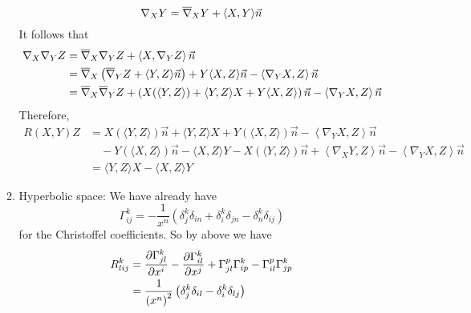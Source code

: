 \begin{enumerate}[label=\arabic{*}.]
\begin{exam}
\begin{enumerate}[label=(\arabic{*})]
			\begin{equation*}
				\nabla_X Y=\overline{\nabla}_X Y+\langle X, Y\rangle \vec{n}
			\end{equation*}
			It follows that
			\begin{equation*}
				\begin{aligned}
					\nabla_X\nabla_YZ &= \overline{\nabla}_X\nabla_YZ + \left\langle X,\nabla_YZ \right\rangle\vec{n}\\
					&= \overline{\nabla}_X\left(\overline{\nabla}_Y Z+\langle Y, Z\rangle \vec{n}\right) + Y\langle X, Z\rangle \vec{n}-\left\langle\nabla_Y X, Z\right\rangle \vec{n} \\
					&= \overline{\nabla}_X\overline{\nabla}_Y Z+\left(X(\langle Y, Z\rangle)+ \langle Y, Z\rangle X+Y\langle X, Z\rangle\right)\vec{n} - \left\langle\nabla_Y X, Z\right\rangle \vec{n}
				\end{aligned}
			\end{equation*}
			Therefore,
			\begin{equation*}
				\begin{aligned}
					R(X,Y)Z &= X(\langle Y, Z\rangle) \vec{n}+\langle Y, Z\rangle X+Y(\langle X, Z\rangle) \vec{n}-\left\langle\nabla_Y X, Z\right\rangle \vec{n} \\
					&\quad -Y(\langle X, Z\rangle) \vec{n}-\langle X, Z\rangle Y-X(\langle Y, Z\rangle) \vec{n}+\left\langle\nabla_X Y, Z\right\rangle \vec{n}-\left\langle\nabla_Y X, Z\right\rangle \vec{n} \\
					&= \langle Y, Z\rangle X-\langle X, Z\rangle Y
				\end{aligned}
			\end{equation*}
			\item Hyperbolic space: We have already have
			\begin{equation*}
				\Gamma^k_{ij} = -\frac{1}{x^n} \left(\delta^k_j\delta_{in} + \delta^k_i\delta_{jn} - \delta^k_n\delta_{ij}\right)
			\end{equation*}
			for the Christoffel coefficients. So by above we have
			\begin{equation*}
				\begin{aligned}
					R_{l i j}^k&= \frac{\partial \Gamma_{j l}^k}{\partial x^i}-\frac{\partial \Gamma_{i l}^k}{\partial x^j}+\Gamma_{j l}^p \Gamma_{i p}^k-\Gamma_{i l}^p \Gamma_{j p}^k\\
					&= \frac{1}{\left(x^n\right)^2}\left(\delta^k_j\delta_{il}-\delta^k_i\delta_{lj}\right)
				\end{aligned}
			\end{equation*}
		\end{enumerate}
	\end{exam}


\end{enumerate}
